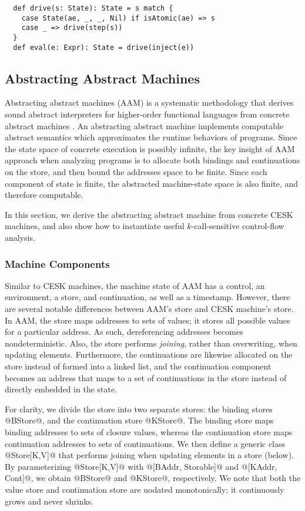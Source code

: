 \documentclass[acmsmall, review]{acmart}\settopmatter{}
\begin{document}
\begin{lstlisting}
  def drive(s: State): State = s match {
    case State(ae, _, _, Nil) if isAtomic(ae) => s
    case _ => drive(step(s))
  }
  def eval(e: Expr): State = drive(inject(e))
\end{lstlisting}

\subsection{Abstracting Abstract Machines} \label{aam}
Abstracting abstract machines (AAM) is a systematic methodology that derives sound
abstract interpreters for higher-order functional languages from concrete abstract 
machines \cite{van2012systematic, van2010abstracting}. An abstracting abstract machine
implements computable abstract semantics which approximates the runtime behaviors of 
programs.
Since the state space of concrete execution is possibly infinite, the key insight of 
AAM approach when analyzing programs is to allocate both bindings and continuations 
on the store, and then bound the addresses space to be finite. Since each component
of state is finite, the abstracted machine-state space is also finite, and therefore
computable.

In this section, we derive the abstracting abstract machine from concrete
CESK machines, and also show how to instantiate useful $k$-call-sensitive 
control-flow analysis.

\subsubsection{Machine Components}

Similar to CESK machines, the machine state of AAM has a control, an environment, a store,
and continuation, as well as a timestamp. However, there are several notable differences
between AAM's store and CESK machine's store. In AAM, the store maps addresses to sets of
values; it stores all possible values for a particular address. As such, dereferencing
addresses becomes nondeterministic. Also, the store performs \emph{joining}, rather than
overwriting, when updating elements. Furthermore, the continuations are likewise allocated
on the store instead of formed into a linked list, and the continuation component becomes
an address that maps to a set of continuations in the store instead of directly embedded
in the state.

For clarity, we divide the store into two separate stores: the binding stores @BStore@, and
the continuation store @KStore@.
The binding store maps binding addresses to sets of closure values, whereas the continuation
store maps continuation addresses to sets of continuations.
We then define a generic class @Store[K,V]@ that performs joining when updating elements
in a store (below). By parameterizing @Store[K,V]@ with @[BAddr, Storable]@ and
@[KAddr, Cont]@, we obtain @BStore@ and @KStore@, respectively.
We note that both the value store and continuation store are uodated monotonically;
it continuously grows and never shrinks.
\end{document}
